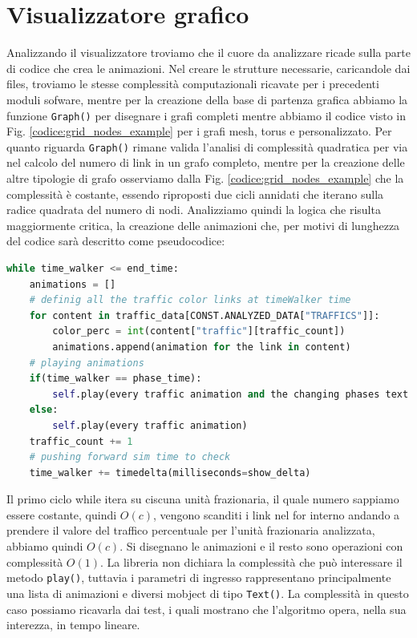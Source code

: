 \documentclass[binding=0.6cm]{sapthesis}
\begin{document}
\section{Visualizzatore grafico}
Analizzando il visualizzatore troviamo che il cuore da analizzare ricade sulla parte di codice che crea le animazioni. Nel creare le strutture necessarie, caricandole dai files,
troviamo le stesse complessità computazionali ricavate per i precedenti moduli sofware, mentre per la creazione della base di partenza grafica abbiamo
la funzione \lstinline|Graph()| per disegnare i grafi completi mentre abbiamo il codice visto in Fig. \ref{codice:grid_nodes_example} per i grafi mesh, torus e personalizzato.
Per quanto riguarda \lstinline|Graph()| rimane valida l'analisi di complessità quadratica per via nel calcolo del numero di link in un grafo completo, mentre per la creazione delle altre tipologie di grafo
osserviamo dalla Fig. \ref{codice:grid_nodes_example} che la complessità è costante, essendo riproposti due cicli annidati che iterano sulla radice quadrata
del numero di nodi. 
Analizziamo quindi la logica che risulta maggiormente critica, la creazione delle animazioni che,
per motivi di lunghezza del codice sarà descritto come pseudocodice:

{\scriptsize
\begin{lstlisting}[language=Python, basicstyle=\ttfamily, caption={Logica creazione animazioni}, label={codice:create_animation}, breaklines=true]
while time_walker <= end_time:
    animations = []
    # definig all the traffic color links at timeWalker time
    for content in traffic_data[CONST.ANALYZED_DATA["TRAFFICS"]]:
        color_perc = int(content["traffic"][traffic_count])
        animations.append(animation for the link in content)
    # playing animations
    if(time_walker == phase_time):
        self.play(every traffic animation and the changing phases text animation)
    else:
        self.play(every traffic animation)
    traffic_count += 1
    # pushing forward sim time to check
    time_walker += timedelta(milliseconds=show_delta)
\end{lstlisting}
}

Il primo ciclo while itera su ciscuna unità frazionaria, il quale numero sappiamo essere costante, quindi \(O(c)\), vengono scanditi i link nel for interno andando a prendere il valore del traffico percentuale per l'unità frazionaria analizzata, abbiamo quindi \(O(c)\).
Si disegnano le animazioni e il resto sono operazioni con complessità \(O(1)\). La libreria non dichiara la complessità che può interessare il metodo \lstinline|play()|, tuttavia
i parametri di ingresso rappresentano principalmente una lista di animazioni e diversi mobject di tipo \lstinline|Text()|. 
La complessità in questo caso possiamo ricavarla dai test, i quali mostrano che l'algoritmo opera, nella sua interezza, in tempo lineare.
\end{document}
